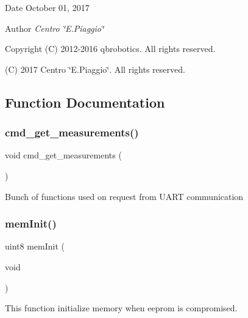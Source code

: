 \begin{DoxyDate}{Date}
October 01, 2017 
\end{DoxyDate}
\begin{DoxyAuthor}{Author}
{\itshape Centro \char`\"{}\+E.\+Piaggio\char`\"{}} 
\end{DoxyAuthor}
\begin{DoxyCopyright}{Copyright}
(C) 2012-\/2016 qbrobotics. All rights reserved. 

(C) 2017 Centro \char`\"{}\+E.\+Piaggio\char`\"{}. All rights reserved. 
\end{DoxyCopyright}


\subsection{Function Documentation}
\mbox{\label{command__processing_8c_af5ccd403f1d3e49c97bafd6e7713cff3}} 
\subsubsection{cmd\+\_\+get\+\_\+measurements()}
{\footnotesize\ttfamily void cmd\+\_\+get\+\_\+measurements (\begin{DoxyParamCaption}{ }\end{DoxyParamCaption})}

Bunch of functions used on request from U\+A\+RT communication \mbox{\label{command__processing_8c_a48f1d2aa212e255d0a3322e576fc8574}} 
\subsubsection{mem\+Init()}
{\footnotesize\ttfamily uint8 mem\+Init (\begin{DoxyParamCaption}\item[{void}]{ }\end{DoxyParamCaption})}

This function initialize memory when eeprom is compromised. \mbox{\label{command__processing_8c_a494f1f72ae370f0057e5aa3db73ef6fb}} 
